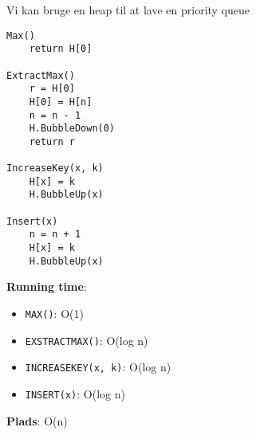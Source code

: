 Vi kan bruge en heap til at lave en priority queue\\
\begin{lstlisting}[frame=single, mathescape=true]
Max()
	return H[0]

ExtractMax()
	r = H[0]
	H[0] = H[n]
	n = n - 1
	H.BubbleDown(0)
	return r

IncreaseKey(x, k)
	H[x] = k
	H.BubbleUp(x)

Insert(x)
	n = n + 1
	H[x] = k
	H.BubbleUp(x)
\end{lstlisting}
\textbf{Running time}:
\begin{itemize}
	\item \texttt{MAX()}: O(1)
	\item \texttt{EXSTRACTMAX()}: O(log n)
	\item \texttt{INCREASEKEY(x, k)}: O(log n)
	\item \texttt{INSERT(x)}: O(log n)
\end{itemize}
\textbf{Plads}: O(n)